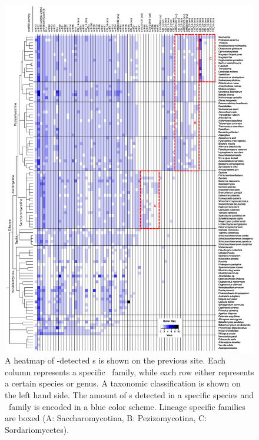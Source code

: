 \begin{figure}
  \vspace{-1cm}
  \centering
  \includegraphics[width=1.05\textwidth]{pics/CD_snoRNAs_collapsed.short_naming.rotated.eps}
  \caption{A heatmap of
    \snostrip-detected \cd s is shown on the previous site. Each column represents a specific \sno\
    family, while each row either represents a certain species or
    genus. A taxonomic classification is shown on the left hand side. The amount of
    \sno s detected in a specific species and \sno\ family is encoded in a
    blue color scheme. Lineage specific families are boxed (A:
    Saccharomycotina, B: Pezizomycotina, C: Sordariomycetes). %
  }
  \label{fig:heatmap_CD_snoRNAs} 
\end{figure}



